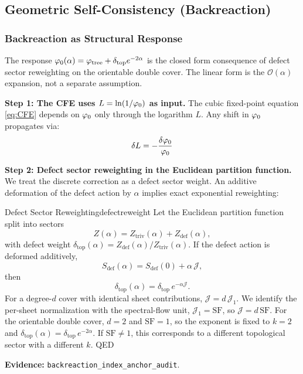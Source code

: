 \subsection{Geometric Self-Consistency (Backreaction)}

\subsubsection{Backreaction as Structural Response}

The response $\varphi_0(\alpha) = \varphi_{\mathrm{tree}} + \delta_{\mathrm{top}} e^{-2\alpha}$ is the closed form
consequence of defect sector reweighting on the orientable double cover. The linear form
is the $\mathcal{O}(\alpha)$ expansion, not a separate assumption.

\textbf{Step 1: The CFE uses $L = \ln(1/\varphi_0)$ as input.}
The cubic fixed-point equation \eqref{eq:CFE} depends on $\varphi_0$ only through 
the logarithm $L$. Any shift in $\varphi_0$ propagates via:
\begin{equation}
    \delta L = -\frac{\delta\varphi_0}{\varphi_0}
\end{equation}

\textbf{Step 2: Defect sector reweighting in the Euclidean partition function.}
We treat the discrete correction as a defect sector weight. An additive deformation of the
defect action by $\alpha$ implies exact exponential reweighting:
\begin{lemma}{Defect Sector Reweighting}{defectreweight}
Let the Euclidean partition function split into sectors
\begin{equation}
    Z(\alpha)=Z_{\mathrm{triv}}(\alpha)+Z_{\mathrm{def}}(\alpha),
\end{equation}
with defect weight $\delta_{\mathrm{top}}(\alpha)=Z_{\mathrm{def}}(\alpha)/Z_{\mathrm{triv}}(\alpha)$.
If the defect action is deformed additively,
\begin{equation}
    S_{\mathrm{def}}(\alpha)=S_{\mathrm{def}}(0)+\alpha\,\mathcal{J},
\end{equation}
then
\begin{equation}
    \delta_{\mathrm{top}}(\alpha)=\delta_{\mathrm{top}}\,e^{-\alpha\mathcal{J}}.
\end{equation}
For a degree-$d$ cover with identical sheet contributions, $\mathcal{J}=d\,\mathcal{J}_1$.
We identify the per-sheet normalization with the spectral-flow unit, $\mathcal{J}_1=\mathrm{SF}$,
so $\mathcal{J}=d\,\mathrm{SF}$. For the orientable double cover, $d=2$ and $\mathrm{SF}=1$,
so the exponent is fixed to $k=2$ and
$\delta_{\mathrm{top}}(\alpha)=\delta_{\mathrm{top}}\,e^{-2\alpha}$. If $\mathrm{SF}\neq 1$,
this corresponds to a different topological sector with a different $k$. \hfill QED
\end{lemma}
\textbf{Evidence:} \texttt{backreaction\_index\_anchor\_audit}.

